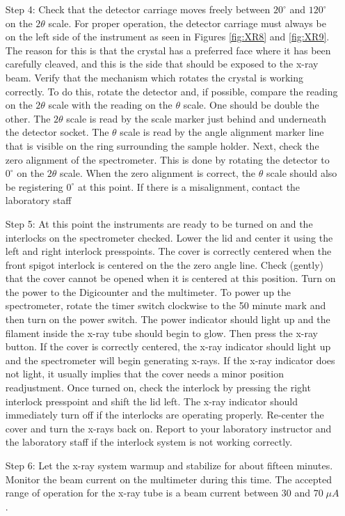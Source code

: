 \begin{itemize}[leftmargin = 50pt]
    \item[Step 4:] Check that the detector carriage moves freely between $20^{\circ}$ and $120^{\circ}$ on the $2\theta$ scale. For proper operation, the detector carriage must always be on the left side of the instrument as seen in Figures \ref{fig:XR8} and \ref{fig:XR9}. The reason for this is that the crystal has a preferred face where it has been carefully cleaved, and this is the side that should be exposed to the x-ray beam. Verify that the mechanism which rotates the crystal is working correctly. To do this, rotate the detector and, if possible, compare the reading on the $2\theta$ scale with the reading on the $\theta$ scale. One should be double the other. The $2\theta$ scale is read by the scale marker just behind and underneath the detector socket. The $\theta$ scale is read by the angle alignment marker line that is visible on the ring surrounding the sample holder. Next, check the zero alignment of the spectrometer. This is done by rotating the detector to $0^{\circ}$ on the $2\theta$ scale. When the zero alignment is correct, the $\theta$ scale should also be registering $0^{\circ}$ at this point. If there is a misalignment, contact the laboratory staff
    \item[Step 5:] At this point the instruments are ready to be turned on and the interlocks on the spectrometer checked. Lower the lid and center it using the left and right interlock presspoints. The cover is correctly centered when the front spigot interlock is centered on the the zero angle line. Check (gently) that the cover cannot be opened when it is centered at this position. Turn on the power to the Digicounter and the multimeter. To power up the spectrometer, rotate the timer switch clockwise to the 50 minute mark and then turn on the power switch. The power indicator should light up and the filament inside the x-ray tube should begin to glow. Then press the x-ray button. If the cover is correctly centered, the x-ray indicator should light up and the spectrometer will begin generating x-rays. If the x-ray indicator does not light, it usually implies that the cover needs a minor position readjustment. Once turned on, check the interlock by pressing the right interlock presspoint and shift the lid left. The x-ray indicator should immediately turn off if the interlocks are operating properly. Re-center the cover and turn the x-rays back on. Report to your laboratory instructor and the laboratory staff if the interlock system is not working correctly.
    \item[Step 6:] Let the x-ray system warmup and stabilize for about fifteen minutes. Monitor the beam current on the multimeter during this time. The accepted range of operation for the x-ray tube is a beam current between $30$ and $70 \;\mu A$.

\end{itemize}
